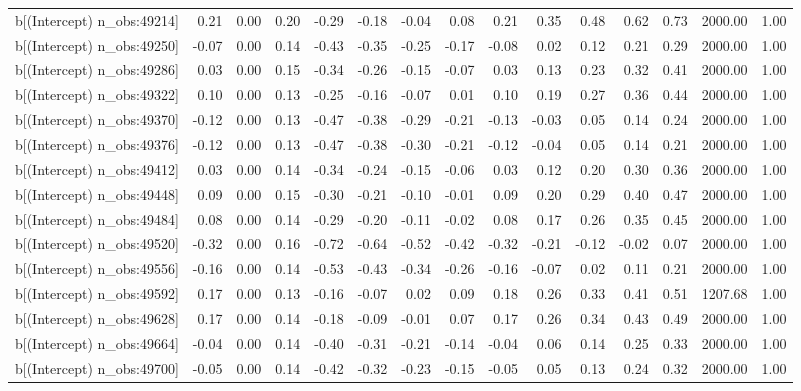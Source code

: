 \begin{table}[ht]
\begin{tabular}{rrrrrrrrrrrrrrr}
  b[(Intercept) n\_obs:49214] & 0.21 & 0.00 & 0.20 & -0.29 & -0.18 & -0.04 & 0.08 & 0.21 & 0.35 & 0.48 & 0.62 & 0.73 & 2000.00 & 1.00 \\ 
  b[(Intercept) n\_obs:49250] & -0.07 & 0.00 & 0.14 & -0.43 & -0.35 & -0.25 & -0.17 & -0.08 & 0.02 & 0.12 & 0.21 & 0.29 & 2000.00 & 1.00 \\ 
  b[(Intercept) n\_obs:49286] & 0.03 & 0.00 & 0.15 & -0.34 & -0.26 & -0.15 & -0.07 & 0.03 & 0.13 & 0.23 & 0.32 & 0.41 & 2000.00 & 1.00 \\ 
  b[(Intercept) n\_obs:49322] & 0.10 & 0.00 & 0.13 & -0.25 & -0.16 & -0.07 & 0.01 & 0.10 & 0.19 & 0.27 & 0.36 & 0.44 & 2000.00 & 1.00 \\ 
  b[(Intercept) n\_obs:49370] & -0.12 & 0.00 & 0.13 & -0.47 & -0.38 & -0.29 & -0.21 & -0.13 & -0.03 & 0.05 & 0.14 & 0.24 & 2000.00 & 1.00 \\ 
  b[(Intercept) n\_obs:49376] & -0.12 & 0.00 & 0.13 & -0.47 & -0.38 & -0.30 & -0.21 & -0.12 & -0.04 & 0.05 & 0.14 & 0.21 & 2000.00 & 1.00 \\ 
  b[(Intercept) n\_obs:49412] & 0.03 & 0.00 & 0.14 & -0.34 & -0.24 & -0.15 & -0.06 & 0.03 & 0.12 & 0.20 & 0.30 & 0.36 & 2000.00 & 1.00 \\ 
  b[(Intercept) n\_obs:49448] & 0.09 & 0.00 & 0.15 & -0.30 & -0.21 & -0.10 & -0.01 & 0.09 & 0.20 & 0.29 & 0.40 & 0.47 & 2000.00 & 1.00 \\ 
  b[(Intercept) n\_obs:49484] & 0.08 & 0.00 & 0.14 & -0.29 & -0.20 & -0.11 & -0.02 & 0.08 & 0.17 & 0.26 & 0.35 & 0.45 & 2000.00 & 1.00 \\ 
  b[(Intercept) n\_obs:49520] & -0.32 & 0.00 & 0.16 & -0.72 & -0.64 & -0.52 & -0.42 & -0.32 & -0.21 & -0.12 & -0.02 & 0.07 & 2000.00 & 1.00 \\ 
  b[(Intercept) n\_obs:49556] & -0.16 & 0.00 & 0.14 & -0.53 & -0.43 & -0.34 & -0.26 & -0.16 & -0.07 & 0.02 & 0.11 & 0.21 & 2000.00 & 1.00 \\ 
  b[(Intercept) n\_obs:49592] & 0.17 & 0.00 & 0.13 & -0.16 & -0.07 & 0.02 & 0.09 & 0.18 & 0.26 & 0.33 & 0.41 & 0.51 & 1207.68 & 1.00 \\ 
  b[(Intercept) n\_obs:49628] & 0.17 & 0.00 & 0.14 & -0.18 & -0.09 & -0.01 & 0.07 & 0.17 & 0.26 & 0.34 & 0.43 & 0.49 & 2000.00 & 1.00 \\ 
  b[(Intercept) n\_obs:49664] & -0.04 & 0.00 & 0.14 & -0.40 & -0.31 & -0.21 & -0.14 & -0.04 & 0.06 & 0.14 & 0.25 & 0.33 & 2000.00 & 1.00 \\ 
  b[(Intercept) n\_obs:49700] & -0.05 & 0.00 & 0.14 & -0.42 & -0.32 & -0.23 & -0.15 & -0.05 & 0.05 & 0.13 & 0.24 & 0.32 & 2000.00 & 1.00 \\ 

\end{tabular}
\end{table}
